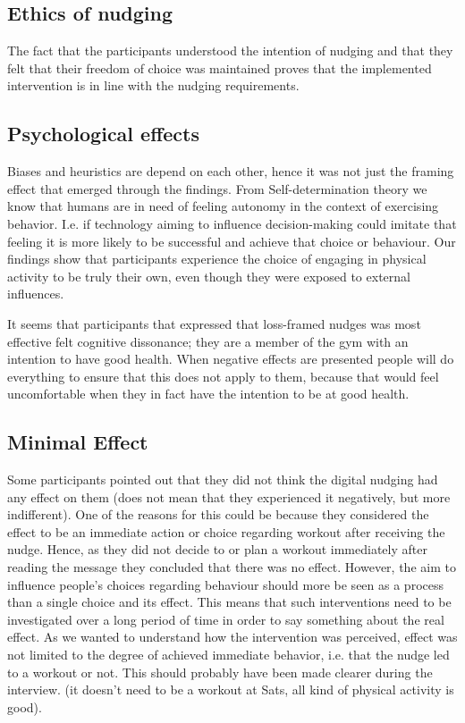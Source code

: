\subsection{Ethics of nudging}
The fact that the participants understood the intention of nudging and that they felt that their freedom of choice was maintained proves that the implemented intervention is in line with the nudging requirements.

\subsection{Psychological effects}
Biases and heuristics are depend on each other, hence it was not just the framing effect that emerged through the findings. From Self-determination theory we know that humans are in need of feeling autonomy in the context of exercising behavior. I.e. if technology aiming to influence decision-making could imitate that feeling it is more likely to be successful and achieve that choice or behaviour. Our findings show that participants experience the choice of engaging in physical activity to be truly their own, even though they were exposed to external influences. 

It seems that participants that expressed that loss-framed nudges was most effective felt cognitive dissonance; they are a member of the gym with an intention to have good health. When negative effects are presented people will do everything to ensure that this does not apply to them, because that would feel uncomfortable when they in fact have the intention to be at good health. 

\subsection{Minimal Effect}
Some participants pointed out that they did not think the digital nudging had any effect on them (does not mean that they experienced it negatively, but more indifferent). One of the reasons for this could be because they considered the effect to be an immediate action or choice regarding workout after receiving the nudge. Hence, as they did not decide to or plan a workout immediately after reading the message they concluded that there was no effect. However, the aim to influence people's choices regarding behaviour should more be seen as a process than a single choice and its effect. This means that such interventions need to be investigated over a long period of time in order to say something about the real effect. As we wanted to understand how the intervention was perceived, effect was not limited to the degree of achieved immediate behavior, i.e. that the nudge led to a workout or not. This should probably have been made clearer during the interview. (it doesn't need to be a workout at Sats, all kind of physical activity is good).

